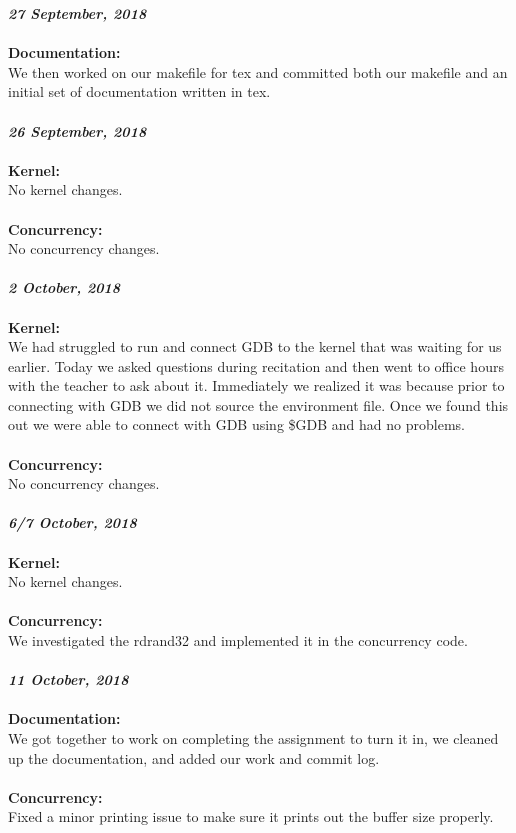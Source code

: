 \documentclass{article}
\begin{document}
\noindent
\textit{\textbf{27 September, 2018}} \\\\
\textbf{Documentation:} \\
\indent We then worked on our makefile for tex and committed both our makefile and an initial set of documentation written in tex.
\\\\

\noindent
\textit{\textbf{26 September, 2018}} \\\\
\textbf{Kernel:} \\
\indent No kernel changes.
\\\\
\textbf{Concurrency:} \\
\indent No concurrency changes.
\\\\

\noindent
\textit{\textbf{2 October, 2018}} \\\\
\textbf{Kernel:} \\
\indent We had struggled to run and connect GDB to the kernel that was waiting for us earlier. Today we asked questions during recitation and then went to office hours with the teacher to ask about it. Immediately we realized it was because prior to connecting with GDB we did not source the environment file. Once we found this out we were able to connect with GDB using \$GDB and had no problems.
\\\\
\textbf{Concurrency:} \\
\indent No concurrency changes.
\\\\

\noindent
\textit{\textbf{6/7 October, 2018}} \\\\
\textbf{Kernel:} \\
\indent No kernel changes.
\\\\
\textbf{Concurrency:} \\
\indent We investigated the rdrand32 and implemented it in the concurrency code.
\\\\

\noindent
\textit{\textbf{11 October, 2018}} \\\\
\textbf{Documentation:} \\
\indent We got together to work on completing the assignment to turn it in, we cleaned up the documentation, and added our work and commit log.
\\\\
\textbf{Concurrency:} \\
\indent Fixed a minor printing issue to make sure it prints out the buffer size properly.
\\\\

\end{document}
